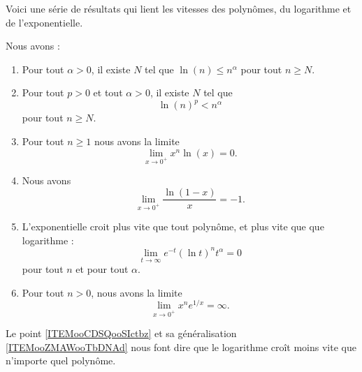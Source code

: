 Voici une série de résultats qui lient les vitesses des polynômes, du logarithme et de l'exponentielle.

\begin{proposition}     \label{PROPooKVIFooGdKpfP}
    Nous avons :
    \begin{enumerate}
        \item   \label{ITEMooCDSQooSIctbz}
            Pour tout \( \alpha>0\), il existe \( N\) tel que \( \ln(n)\leq n^{\alpha}\) pour tout \( n\geq N\).
        \item       \label{ITEMooZMAWooTbDNAd}
            Pour tout \( p>0\) et tout \( \alpha>0\), il existe \( N\) tel que 
            \begin{equation}
                \ln(n)^p<n^{\alpha}
            \end{equation}
            pour tout \( n\geq N\).
        \item       \label{ITEMooBLNOooZQNTfd}
            Pour tout \( n\geq 1\) nous avons la limite
            \begin{equation}
                \lim_{x\to 0^+} x^n\ln(x)=0.
            \end{equation}
        \item       \label{ITEMooMLNMooAyJTox}
            Nous avons
            \begin{equation}
                \lim_{x\to 0^+} \frac{ \ln(1-x) }{ x }=-1.
            \end{equation}
        \item       \label{ITEMooIQEKooBionsK}
            L'exponentielle croit plus vite que tout polynôme, et plus vite que que logarithme :
    \begin{equation}        \label{EqExpDecrtPlusVite}
        \lim_{t\to\infty} e^{-t}(\ln t)^{n}t^{\alpha}=0
    \end{equation}
    pour tout $n$ et pour tout $\alpha$.
\item       \label{ITEMooDUQWooNvAvmR}
    Pour tout \( n>0\), nous avons la limite
    \begin{equation}
        \lim_{x\to 0^+} x^n e^{1/x}=\infty.
    \end{equation}
    \end{enumerate}
\end{proposition}

Le point \ref{ITEMooCDSQooSIctbz} et sa généralisation \ref{ITEMooZMAWooTbDNAd} nous font dire que le logarithme croît moins vite que n'importe quel polynôme.

